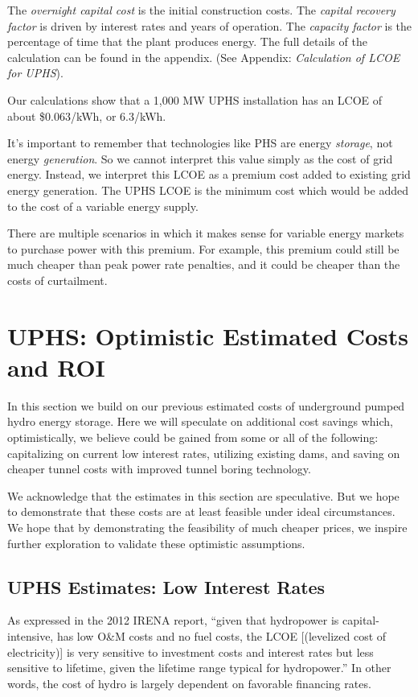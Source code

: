 \documentclass[hidelinks,12pt,a4paper]{article}
\begin{document}
The \textit{overnight capital cost} is the initial construction costs. The \textit{capital recovery factor} is driven by interest rates and years of operation. The \textit{capacity factor} is the percentage of time that the plant produces energy. The full details of the calculation can be found in the appendix. (See Appendix: \textit{Calculation of LCOE for UPHS}).

\begin{displayquote}
Our calculations show that a 1,000 MW UPHS installation has an LCOE of about \$0.063/kWh, or 6.3\cent/kWh.
\end{displayquote}

It's important to remember that technologies like PHS are energy \textit{storage}, not energy \textit{generation}. So we cannot interpret this value simply as the cost of grid energy. Instead, we interpret this LCOE as a premium cost added to existing grid energy generation. The UPHS LCOE is the minimum cost which would be added to the cost of a variable energy supply.

There are multiple scenarios in which it makes sense for variable energy markets to purchase power with this premium. For example, this premium could still be much cheaper than peak power rate penalties, and it could be cheaper than the costs of curtailment.


\pagebreak[4]
\section{UPHS: Optimistic Estimated Costs and ROI}
In this section we build on our previous estimated costs of underground pumped hydro energy storage. Here we will speculate on additional cost savings which, optimistically, we believe could be gained from some or all of the following: capitalizing on current low interest rates, utilizing existing dams, and saving on cheaper tunnel costs with improved tunnel boring technology.

We acknowledge that the estimates in this section are speculative. But we hope to demonstrate that these costs are at least feasible under ideal circumstances. We hope that by demonstrating the feasibility of much cheaper prices, we inspire further exploration to validate these optimistic assumptions.

\subsection{UPHS Estimates: Low Interest Rates}
As expressed in the 2012 IRENA report, “given that hydropower is capital-intensive, has low O\&M costs and no fuel costs, the LCOE [(levelized cost of electricity)] is very sensitive to investment costs and interest rates but less sensitive to lifetime, given the lifetime range typical for hydropower.” \cite{RenewableEnergyTechnologiesCostAnalysisSeries} In other words, the cost of hydro is largely dependent on favorable financing rates.
\end{document}

